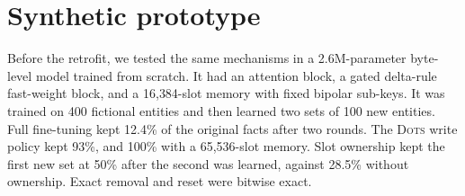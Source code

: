 \documentclass[journal]{IEEEtran}
\newcommand{\sys}{\textsc{Dots}}
\begin{document}
\section{Synthetic prototype}
\label{app:proto}
Before the retrofit, we tested the same mechanisms in a 2.6M-parameter byte-level model trained from scratch. It had an attention block, a gated delta-rule fast-weight block, and a 16{,}384-slot memory with fixed bipolar sub-keys. It was trained on 400 fictional entities and then learned two sets of 100 new entities. Full fine-tuning kept 12.4\% of the original facts after two rounds. The \sys{} write policy kept 93\%, and 100\% with a 65{,}536-slot memory. Slot ownership kept the first new set at 50\% after the second was learned, against 28.5\% without ownership. Exact removal and reset were bitwise exact.
\end{document}
